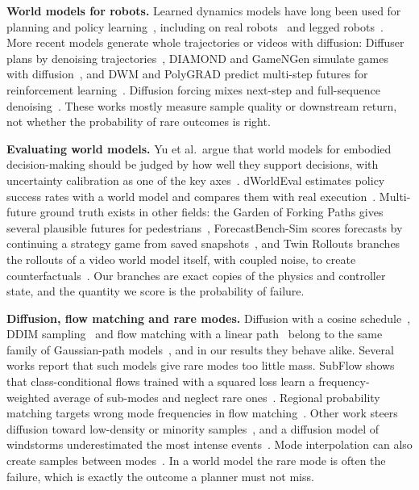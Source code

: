 \documentclass[conference]{IEEEtran}
\begin{document}
\textbf{World models for robots.} Learned dynamics models have long been used for
planning and policy learning~\cite{chua2018pets,ha2018world,hafner2020dreamer,hafner2025dreamerv3},
including on real robots~\cite{wu2022daydreamer} and legged robots~\cite{li2025rwm}.
More recent models generate whole trajectories or videos with diffusion: Diffuser plans by
denoising trajectories~\cite{janner2022diffuser}, DIAMOND and GameNGen simulate games with
diffusion~\cite{alonso2024diamond,valevski2025gamengen}, and DWM and PolyGRAD predict
multi-step futures for reinforcement learning~\cite{ding2024dwm,rigter2024polygrad}.
Diffusion forcing mixes next-step and full-sequence denoising~\cite{chen2024diffusionforcing}.
These works mostly measure sample quality or downstream return, not whether the
probability of rare outcomes is right.

\textbf{Evaluating world models.} Yu et al.\ argue that world models for embodied
decision-making should be judged by how well they support decisions, with uncertainty
calibration as one of the key axes~\cite{yu2026evaluate}. dWorldEval estimates policy
success rates with a world model and compares them with real execution~\cite{li2026dworldeval}.
Multi-future ground truth exists in other fields: the Garden of Forking Paths gives several
plausible futures for pedestrians~\cite{liang2020garden}, ForecastBench-Sim scores
forecasts by continuing a strategy game from saved snapshots~\cite{lee2026forecastbench},
and Twin Rollouts branches the rollouts of a video world model itself, with coupled noise,
to create counterfactuals~\cite{ma2026twin}. Our
branches are exact copies of the physics and controller state, and the quantity we score
is the probability of failure.

\textbf{Diffusion, flow matching and rare modes.} Diffusion with a cosine
schedule~\cite{nichol2021improved}, DDIM sampling~\cite{song2021ddim} and flow matching with
a linear path~\cite{lipman2023flow,liu2023rectified,albergo2023interpolants,tong2024cfm}
belong to the same family of Gaussian-path models~\cite{gao2024diffusionflow}, and in our
results they behave alike. Several works report that such models give rare modes too
little mass. SubFlow shows that class-conditional flows trained with a squared loss learn a
frequency-weighted average of sub-modes and neglect rare ones~\cite{lin2026subflow}.
Regional probability matching targets wrong mode frequencies in flow
matching~\cite{huang2026regional}. Other work steers diffusion toward low-density or
minority samples~\cite{sehwag2022low,um2024minority}, and a diffusion model of windstorms
underestimated the most intense events~\cite{tsoi2025windstorms}. Mode interpolation can
also create samples between modes~\cite{aithal2024hallucination}. In a world model the
rare mode is often the failure, which is exactly the outcome a planner must not miss.
\end{document}
